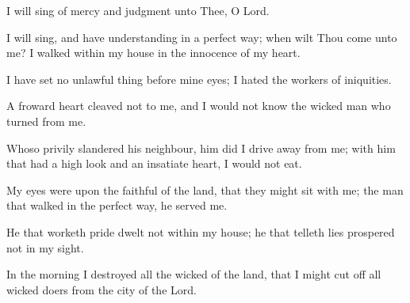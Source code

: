 I will sing of mercy and judgment unto Thee, O Lord.

I will sing, and have understanding in a perfect way; when wilt Thou come unto me? I walked within my house in the innocence of my heart.

I have set no unlawful thing before mine eyes; I hated the workers of iniquities.

A froward heart cleaved not to me, and I would not know the wicked man who turned from me.

Whoso privily slandered his neighbour, him did I drive away from me; with him that had a high look and an insatiate heart, I would not eat.

My eyes were upon the faithful of the land, that they might sit with me; the man that walked in the perfect way, he served me.

He that worketh pride dwelt not within my house; he that telleth lies prospered not in my sight.

In the morning I destroyed all the wicked of the land, that I might cut off all wicked doers from the city of the Lord.
